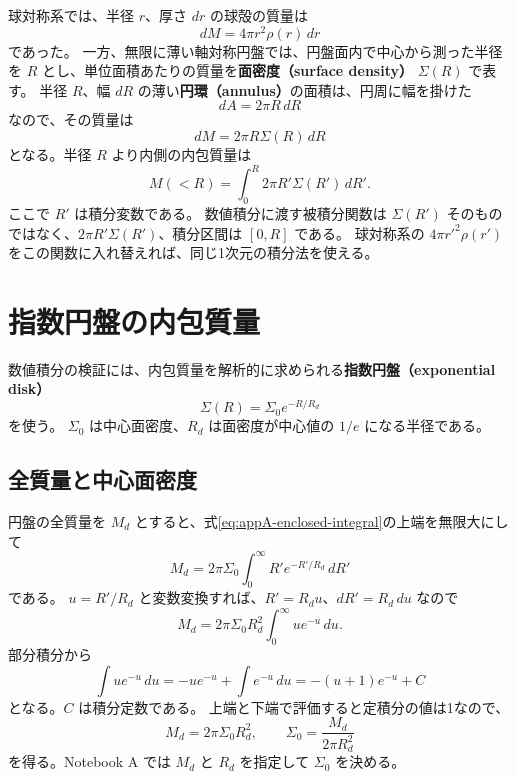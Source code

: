 球対称系では、半径 $r$、厚さ $dr$ の球殻の質量は
\begin{equation}
 dM=4\pi r^2\rho(r)\,dr
\end{equation}
であった。
一方、無限に薄い軸対称円盤では、円盤面内で中心から測った半径を $R$ とし、単位面積あたりの質量を\textbf{面密度（surface density）} $\Sigma(R)$ で表す。
半径 $R$、幅 $dR$ の薄い\textbf{円環（annulus）}の面積は、円周に幅を掛けた
\begin{equation}
 dA=2\pi R\,dR
\end{equation}
なので、その質量は
\begin{equation}
 dM=2\pi R\Sigma(R)\,dR
\label{eq:appA-annulus-mass}
\end{equation}
となる。半径 $R$ より内側の内包質量は
\begin{equation}
 \boxed{M(<R)=\int_0^R 2\pi R'\Sigma(R')\,dR'.}
\label{eq:appA-enclosed-integral}
\end{equation}
ここで $R'$ は積分変数である。
数値積分に渡す被積分関数は $\Sigma(R')$ そのものではなく、$2\pi R'\Sigma(R')$、積分区間は $[0,R]$ である。
球対称系の $4\pi r'^2\rho(r')$ をこの関数に入れ替えれば、同じ1次元の積分法を使える。

\section{指数円盤の内包質量}
\label{sec:appA-exponential}

数値積分の検証には、内包質量を解析的に求められる\textbf{指数円盤（exponential disk）}
\begin{equation}
 \Sigma(R)=\Sigma_0 e^{-R/R_d}
\label{eq:appA-surface-density}
\end{equation}
を使う。
$\Sigma_0$ は中心面密度、$R_d$ は面密度が中心値の $1/e$ になる半径である\cite{ryden2025}。

\subsection{全質量と中心面密度}

円盤の全質量を $M_d$ とすると、式\eqref{eq:appA-enclosed-integral}の上端を無限大にして
\begin{equation}
 M_d=2\pi\Sigma_0\int_0^\infty R'e^{-R'/R_d}\,dR'
\end{equation}
である。
$u=R'/R_d$ と変数変換すれば、$R'=R_du$、$dR'=R_d\,du$ なので
\begin{equation}
 M_d=2\pi\Sigma_0R_d^2\int_0^\infty ue^{-u}\,du.
\end{equation}
部分積分から
\begin{equation}
 \int ue^{-u}\,du=-ue^{-u}+\int e^{-u}\,du=-(u+1)e^{-u}+C
\label{eq:appA-antiderivative}
\end{equation}
となる。$C$ は積分定数である。
上端と下端で評価すると定積分の値は1なので、
\begin{equation}
 M_d=2\pi\Sigma_0R_d^2,\qquad \Sigma_0=\frac{M_d}{2\pi R_d^2}
\label{eq:appA-normalization}
\end{equation}
を得る。Notebook A では $M_d$ と $R_d$ を指定して $\Sigma_0$ を決める。

